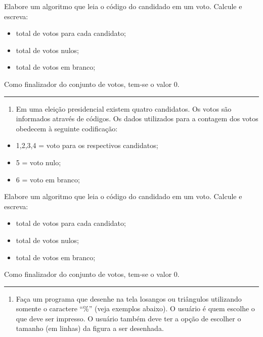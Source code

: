 \documentclass[12pt,a4paper]{article}
\renewcommand{\linethickness}{0.05em}
\providecommand{\tightlist}{%
      \setlength{\itemsep}{0pt}\setlength{\parskip}{0pt}}
\begin{document}
Elabore um algoritmo que leia o código do candidado em um voto. Calcule
e escreva:

\begin{itemize}
\item
  total de votos para cada candidato;
\item
  total de votos nulos;
\item
  total de votos em branco;
\end{itemize}

Como finalizador do conjunto de votos, tem-se o valor 0.

    \begin{center}\rule{0.5\linewidth}{\linethickness}\end{center}

\begin{enumerate}
\def\labelenumi{\arabic{enumi}.}
\setcounter{enumi}{9}
\tightlist
\item
  Em uma eleição presidencial existem quatro candidatos. Os votos são
  informados através de códigos. Os dados utilizados para a contagem dos
  votos obedecem à seguinte codificação:
\end{enumerate}

\begin{itemize}
\item
  1,2,3,4 = voto para os respectivos candidatos;
\item
  5 = voto nulo;
\item
  6 = voto em branco;
\end{itemize}

Elabore um algoritmo que leia o código do candidado em um voto. Calcule
e escreva:

\begin{itemize}
\item
  total de votos para cada candidato;
\item
  total de votos nulos;
\item
  total de votos em branco;
\end{itemize}

Como finalizador do conjunto de votos, tem-se o valor 0.

    \begin{center}\rule{0.5\linewidth}{\linethickness}\end{center}

\begin{enumerate}
\def\labelenumi{\arabic{enumi}.}
\setcounter{enumi}{10}
\tightlist
\item
  Faça um programa que desenhe na tela losangos ou triângulos utilizando
  somente o caractere ``\%'' (veja exemplos abaixo). O usuário é quem
  escolhe o que deve ser impresso. O usuário também deve ter a opção de
  escolher o tamanho (em linhas) da figura a ser desenhada.
\end{enumerate}
\end{document}
